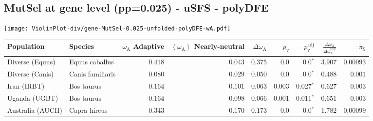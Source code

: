 \subsection{MutSel at gene level (pp=0.025) - uSFS - polyDFE} 
\begin{center}
\texttt{[image: ViolinPlot-div/gene-MutSel-0.025-unfolded-polyDFE-wA.pdf]} 
\begin{adjustbox}{width = 1\textwidth}
\begin{tabular}{|l|l|r|r|r|r|r|r|r|}
\toprule
                     Population &              Species & \specialcell{$\omega_{\mathrm{A}}$ \\ Adaptive} & \specialcell{$\left< \omega_{\mathrm{A}} \right>$ \\ Nearly-neutral} & $\Delta \omega_{\mathrm{A}} $ & $p_{\mathrm{v}}$ & $p_{\mathrm{v}}^{\mathrm{adj}}$ & $\frac{\Delta\omega_{\mathrm{A}}}{\Delta\omega_{\mathrm{A}}^{\mathrm{phy}}}$ & $\pi_{\textrm{S}}$ \\
\midrule
                Diverse (Equus) &       Equus caballus &                                        $ 0.418$ &                                           $ 0.043$ &                      $ 0.375$ &            $0.0$ &                  $\bm{0.0{^*}}$ &                                           $ 3.907$ &          $0.00093$ \\
                Diverse (Canis) &     Canis familiaris &                                        $ 0.080$ &                                           $ 0.029$ &                      $ 0.050$ &            $0.0$ &                  $\bm{0.0{^*}}$ &                                           $ 0.488$ &           $ 0.001$ \\
                    Iran (IRBT) &           Bos taurus &                                        $ 0.164$ &                                           $ 0.101$ &                      $ 0.063$ &         $ 0.003$ &               $\bm{ 0.027{^*}}$ &                                           $ 0.627$ &           $ 0.003$ \\
                  Uganda (UGBT) &           Bos taurus &                                        $ 0.164$ &                                           $ 0.098$ &                      $ 0.066$ &         $ 0.001$ &               $\bm{ 0.011{^*}}$ &                                           $ 0.651$ &           $ 0.003$ \\
               Australia (AUCH) &         Capra hircus &                                        $ 0.343$ &                                           $ 0.170$ &                      $ 0.173$ &            $0.0$ &                  $\bm{0.0{^*}}$ &                                           $ 1.782$ &          $0.00099$ \\

\end{tabular}
\end{adjustbox}
\end{center}

